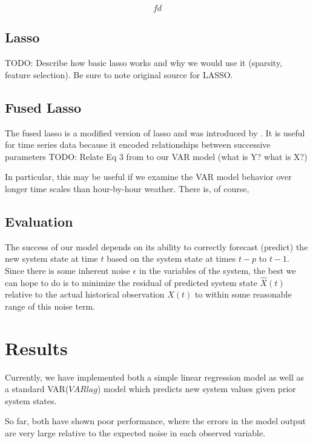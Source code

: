 \documentclass{article} %
\newcommand{\VARlag}{p}
\newcommand{\VARdata}{X}
\newcommand {\VARnoise}{\epsilon}
\newcommand{\predicted}{\hat}
\begin{document}
\begin{equation}
fd
\end{equation}

\subsection{Lasso}
TODO: Describe how basic lasso works and why we would use it (sparsity, feature selection). Be sure to note original \cite{Tibshirani1996} source for LASSO.

\subsection{Fused Lasso}
The fused lasso is a modified version of lasso and was introduced by \cite{Tibshirani2005}. It is useful for time series data because it encoded relationships between successive parameters
TODO: Relate Eq 3 from \cite{Tibshirani2005} to our VAR model (what is Y? what is X?)

In particular, this may be useful if we examine the VAR model behavior over longer time scales than hour-by-hour weather. There is, of course, 

\subsection{Evaluation}
The success of our model depends on its ability to correctly forecast (predict) the new system state at time $t$ based on the system state at times $t-\VARlag$ to $t-1$. Since there is some inherent noise $\VARnoise$ in the variables of the system, the best we can hope to do is to minimize the residual of predicted system state $\predicted{\VARdata}(t)$ relative to the actual historical observation $\VARdata(t)$ to within some reasonable range of this noise term. 


\section{Results}
\label{sec:results}
Currently, we have implemented both a simple linear regression model as well as a standard VAR($VARlag$) model which predicts new system values given prior system states. 

So far, both have shown poor performance, where the errors in the model output are very large relative to the expected noise in each observed variable.
\end{document}
